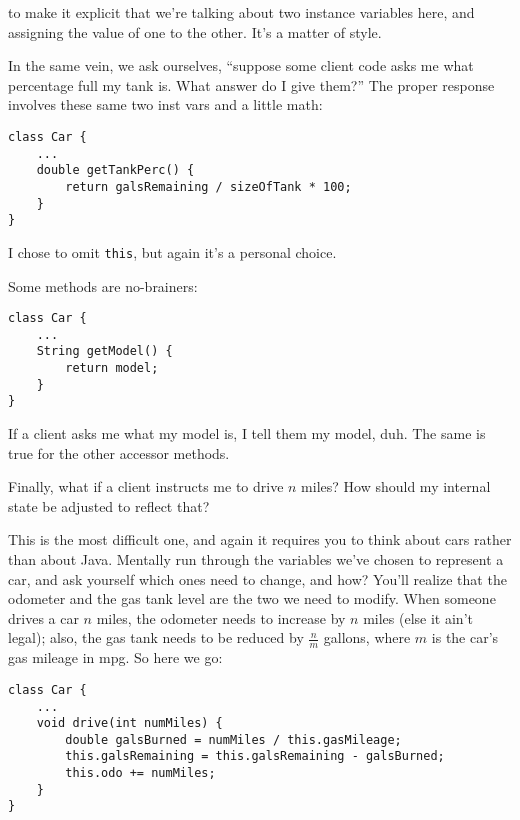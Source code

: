 to make it explicit that we're talking about two instance variables here, and
assigning the value of one to the other. It's a matter of style.

In the same vein, we ask ourselves, ``suppose some client code asks me what
percentage full my tank is. What answer do I give them?'' The proper response
involves these same two inst vars and a little math:

\begin{Verbatim}[samepage=true,fontsize=\scriptsize,frame=single]
class Car {
    ...
    double getTankPerc() {
        return galsRemaining / sizeOfTank * 100;
    }
}
\end{Verbatim}

I chose to omit \texttt{this}, but again it's a personal choice.

\pagebreak
Some methods are no-brainers:

\begin{Verbatim}[samepage=true,fontsize=\scriptsize,frame=single]
class Car {
    ...
    String getModel() {
        return model;
    }
}
\end{Verbatim}

If a client asks me what my model is, I tell them my model, duh. The same is
true for the other accessor methods.

Finally, what if a client instructs me to drive $n$ miles? How should my
internal state be adjusted to reflect that?

This is the most difficult one, and again it requires you to think about cars
rather than about Java. Mentally run through the variables we've chosen to
represent a car, and ask yourself which ones need to change, and how? You'll
realize that the odometer and the gas tank level are the two we need to
modify. When someone drives a car $n$ miles, the odometer needs to increase by
$n$ miles (else it ain't legal); also, the gas tank needs to be reduced by
$\frac{n}{m}$ gallons, where $m$ is the car's gas mileage in mpg. So here we
go:

\begin{Verbatim}[samepage=true,fontsize=\footnotesize,frame=single]
class Car {
    ...
    void drive(int numMiles) {
        double galsBurned = numMiles / this.gasMileage;
        this.galsRemaining = this.galsRemaining - galsBurned;
        this.odo += numMiles;
    }
}
\end{Verbatim}

